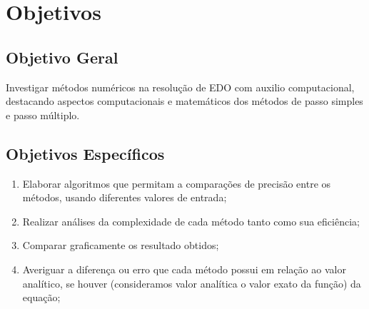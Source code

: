 \section{Objetivos}\label{lobjetivos}
\subsection{Objetivo Geral}
Investigar métodos numéricos na resolução de EDO com auxilio 
computacional, destacando aspectos computacionais e matemáticos dos
métodos de passo simples e passo múltiplo.
\subsection{Objetivos Específicos}
\begin{enumerate}[label=\roman*.]
\item Elaborar algoritmos que permitam a comparações de precisão entre os métodos, usando diferentes valores de entrada;
\item Realizar análises da complexidade de cada método tanto como sua eficiência;
\item Comparar graficamente os resultado obtidos;
\item Averiguar a diferença ou erro que cada método possui em relação ao valor analítico, se houver (consideramos valor analítica o valor exato da função) da equação;
\end{enumerate}

